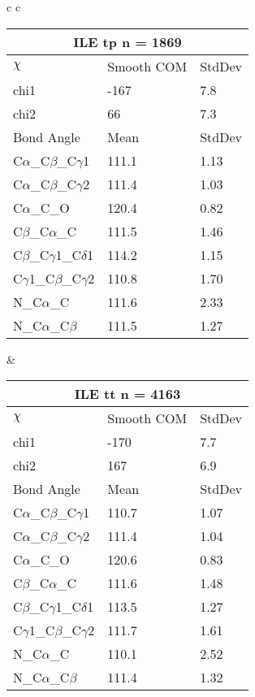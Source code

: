 \begin{longtable}{ c c }
  \\
  \begin{tabular}{ l l l }
  \toprule
  \multicolumn{3}{c}{ILE \textbf{tp} n = 1869} \\ \toprule
  $\chi$       & Smooth COM & StdDev \\ \midrule
  chi1 & -167 & 7.8 \\ 
  chi2 & 66 & 7.3 \\ \midrule
  Bond Angle   & Mean     & StdDev \\ \midrule
  C$\alpha$\_C$\beta$\_C$\gamma$1 & 111.1 & 1.13\\
  C$\alpha$\_C$\beta$\_C$\gamma$2 & 111.4 & 1.03\\
  C$\alpha$\_C\_O & 120.4 & 0.82\\
  C$\beta$\_C$\alpha$\_C & 111.5 & 1.46\\
  C$\beta$\_C$\gamma$1\_C$\delta$1 & 114.2 & 1.15\\
  C$\gamma$1\_C$\beta$\_C$\gamma$2 & 110.8 & 1.70\\
  N\_C$\alpha$\_C & 111.6 & 2.33\\
  N\_C$\alpha$\_C$\beta$ & 111.5 & 1.27\\
  \bottomrule
  \end{tabular}
  &
  \begin{tabular}{ l l l }
  \toprule
  \multicolumn{3}{c}{ILE \textbf{tt} n = 4163} \\ \toprule
  $\chi$       & Smooth COM & StdDev \\ \midrule
  chi1 & -170 & 7.7 \\ 
  chi2 & 167 & 6.9 \\ \midrule
  Bond Angle   & Mean     & StdDev \\ \midrule
  C$\alpha$\_C$\beta$\_C$\gamma$1 & 110.7 & 1.07\\
  C$\alpha$\_C$\beta$\_C$\gamma$2 & 111.4 & 1.04\\
  C$\alpha$\_C\_O & 120.6 & 0.83\\
  C$\beta$\_C$\alpha$\_C & 111.6 & 1.48\\
  C$\beta$\_C$\gamma$1\_C$\delta$1 & 113.5 & 1.27\\
  C$\gamma$1\_C$\beta$\_C$\gamma$2 & 111.7 & 1.61\\
  N\_C$\alpha$\_C & 110.1 & 2.52\\
  N\_C$\alpha$\_C$\beta$ & 111.4 & 1.32\\
  \bottomrule
  \end{tabular}
  \\
  \begin{tabular}{ l l l }

\end{tabular}
\end{longtable}
